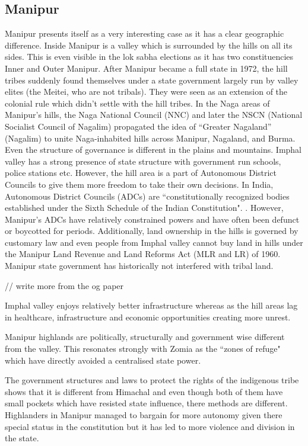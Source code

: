 \subsection{Manipur}

Manipur presents itself as a very interesting case as it has a clear geographic difference. Inside Manipur is a valley which is surrounded by the hills on all its sides. This is even visible in the lok sabha elections as it has two constituencies Inner and Outer Manipur. After Manipur became a full state in 1972, the hill tribes suddenly found themselves under a state government largely run by valley elites (the Meitei, who are not tribals). They were seen as an extension of the colonial rule which didn't settle with the hill tribes.  In the Naga areas of Manipur’s hills, the Naga National Council (NNC) and later the NSCN (National Socialist Council of Nagalim) propagated the idea of ``Greater Nagaland” (Nagalim) to unite Naga-inhabited hills across Manipur, Nagaland, and Burma. Even the structure of governance is different in the plains and mountains. Imphal valley has a strong presence of state structure with government run schools, police stations etc. However, the hill area is a part of Autonomous District Councils to give them more freedom to take their own decisions. In India, Autonomous District Councils (ADCs) are ``constitutionally recognized bodies established under the Sixth Schedule of the Indian Constitution". . However, Manipur’s ADCs have relatively constrained powers and have often been defunct or boycotted for periods. Additionally, land ownership in the hills is governed by customary law and even people from Imphal valley cannot buy land in hills under the  Manipur Land Revenue and Land Reforms Act (MLR and LR) of 1960. Manipur state government has historically not interfered with tribal land. 

// write more from the og paper

Imphal valley enjoys relatively better infrastructure whereas as the hill areas lag in healthcare, infrastructure and economic opportunities creating more unrest. \citep{lacina2009problem}

Manipur highlands are politically, structurally and government wise different from the valley. This resonates strongly with Zomia as the ``zones of refuge" which have directly avoided a centralised state power.

The government structures and laws to protect the rights of the indigenous tribe shows that it is different from Himachal and even though both of them have small pockets which have resisted state influence, there methods are different. Highlanders in Manipur managed to bargain for more autonomy given there special status in the constitution but it has led to more violence and division in the state.